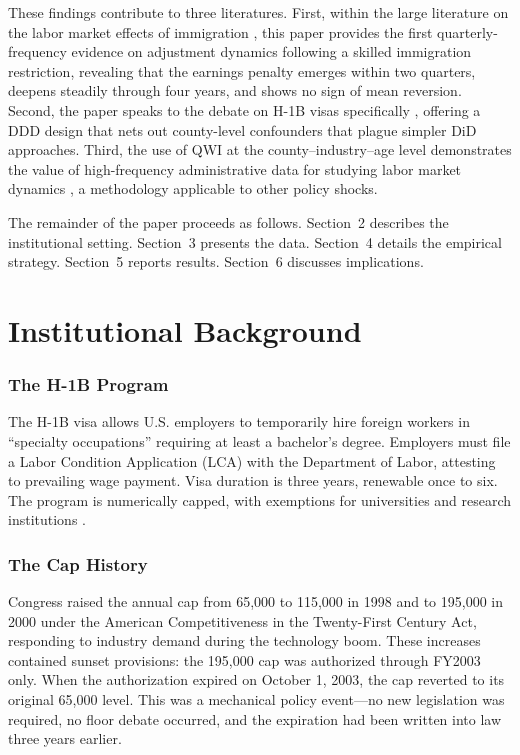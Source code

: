 \documentclass[12pt]{article}
\begin{document}
These findings contribute to three literatures. First, within the large literature on the labor market effects of immigration \citep{borjas2003labor, card2009immigration, peri2012effect, dustmann2013effect}, this paper provides the first quarterly-frequency evidence on adjustment dynamics following a skilled immigration restriction, revealing that the earnings penalty emerges within two quarters, deepens steadily through four years, and shows no sign of mean reversion. Second, the paper speaks to the debate on H-1B visas specifically \citep{kerr2010lincoln, bound2017understanding, doran2022high, glennon2023not}, offering a DDD design that nets out county-level confounders that plague simpler DiD approaches. Third, the use of QWI at the county--industry--age level demonstrates the value of high-frequency administrative data for studying labor market dynamics \citep{abowd2009lehd, hyatt2017job}, a methodology applicable to other policy shocks.

The remainder of the paper proceeds as follows. Section~2 describes the institutional setting. Section~3 presents the data. Section~4 details the empirical strategy. Section~5 reports results. Section~6 discusses implications.

\section{Institutional Background}

\subsubsection*{The H-1B Program} The H-1B visa allows U.S. employers to temporarily hire foreign workers in ``specialty occupations'' requiring at least a bachelor's degree. Employers must file a Labor Condition Application (LCA) with the Department of Labor, attesting to prevailing wage payment. Visa duration is three years, renewable once to six. The program is numerically capped, with exemptions for universities and research institutions \citep{kerr2010lincoln}.

\subsubsection*{The Cap History} Congress raised the annual cap from 65,000 to 115,000 in 1998 and to 195,000 in 2000 under the American Competitiveness in the Twenty-First Century Act, responding to industry demand during the technology boom. These increases contained sunset provisions: the 195,000 cap was authorized through FY2003 only. When the authorization expired on October 1, 2003, the cap reverted to its original 65,000 level. This was a mechanical policy event---no new legislation was required, no floor debate occurred, and the expiration had been written into law three years earlier.
\end{document}
